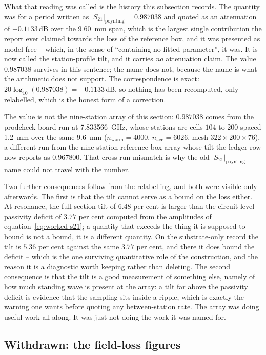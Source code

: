 What that reading was called is the history this subsection records. The quantity was for a period written as
$|S_{21}|_{\text{poynting}} = 0.987038$ and quoted as an attenuation of $-0.1133$\,dB over the \SI{9.60}{mm}
span, which is the largest single contribution the report ever claimed towards the loss of the reference box,
and it was presented as model-free -- which, in the sense of ``containing no fitted parameter'', it was. It is
now called the station-profile tilt, and it carries \emph{no} attenuation claim. The value $0.987038$ survives
in this sentence; the name does not, because the name is what the arithmetic does not support.
The correspondence is exact: $20\log_{10}(0.987038) = -0.1133$\,dB, so nothing has been recomputed, only
relabelled, which is the honest form of a correction.

The value is not the nine-station array of this section: $0.987038$ comes from the prodcheck board run at
\SI{7.833566}{\giga\hertz}, whose stations are cells $104$ to $200$ spaced \SI{1.2}{\milli\metre} over the same
\SI{9.6}{\milli\metre} ($n_{\text{warm}} = 4000$, $n_{\text{acc}} = 6026$, mesh $322\times200\times76$), a
different run from the nine-station reference-box array whose tilt the ledger row now reports as $0.967800$.
That cross-run mismatch is why the old $|S_{21}|_{\text{poynting}}$ name could not travel with the number.

Two further consequences follow from the relabelling, and both were visible only afterwards. The first is that
the tilt cannot serve as a bound on the loss either. At resonance, the full-section tilt of $6.48$ per cent is
larger than the circuit-level passivity deficit of $3.77$ per cent computed from the amplitudes of
equation~\eqref{eq:worked-s21}; a quantity that exceeds the thing it is supposed to bound is not a bound, it is
a different quantity. On the substrate-only record the tilt is $5.36$ per cent against the same $3.77$ per cent,
and there it does bound the deficit -- which is the one surviving quantitative role of the construction, and the
reason it is a diagnostic worth keeping rather than deleting. The second consequence is that the tilt is a good
measurement of something else, namely of how much standing wave is present at the array: a tilt far above the
passivity deficit is evidence that the sampling sits inside a ripple, which is exactly the warning one wants
before quoting any between-station rate. The array was doing useful work all along. It was just not doing the
work it was named for.

\subsection{Withdrawn: the field-loss figures}
\label{sec:worked-withdrawn}

